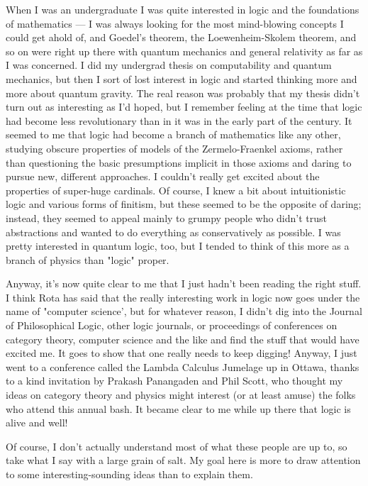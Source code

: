 

When I was an undergraduate I was quite interested in logic and the
foundations of mathematics --- I was always looking for the most
mind-blowing concepts I could get ahold of, and Goedel's theorem, the
Loewenheim-Skolem theorem, and so on were right up there with quantum
mechanics and general relativity as far as I was concerned.  I did my
undergrad thesis on computability and quantum mechanics, but then I sort
of lost interest in logic and started thinking more and more about
quantum gravity.  The real reason was probably that my thesis didn't
turn out as interesting as I'd hoped, but I remember feeling at the time
that logic had become less revolutionary than in it was in the early
part of the century.  It seemed to me that logic had become a branch of
mathematics like any other, studying obscure properties of models of the
Zermelo-Fraenkel axioms, rather than questioning the basic presumptions
implicit in those axioms and daring to pursue new, different approaches.
I couldn't really get excited about the properties of super-huge
cardinals.  Of course, I knew a bit about intuitionistic logic and
various forms of finitism, but these seemed to be the opposite of
daring; instead, they seemed to appeal mainly to grumpy people who
didn't trust abstractions and wanted to do everything as conservatively
as possible.  I was pretty interested in quantum logic, too, but I
tended to think of this more as a branch of physics than "logic" proper.

Anyway, it's now quite clear to me that I just hadn't been reading the
right stuff.  I think Rota has said that the really interesting work in
logic now goes under the name of "computer science', but for whatever
reason, I didn't dig into the Journal of Philosophical Logic, other
logic journals, or proceedings of conferences on category theory,
computer science and the like and find the stuff that would have excited
me.  It goes to show that one really needs to keep digging!  Anyway, I
just went to a conference called the Lambda Calculus Jumelage up in
Ottawa, thanks to a kind invitation by Prakash Panangaden and Phil
Scott, who thought my ideas on category theory and physics might
interest (or at least amuse) the folks who attend this annual bash.  It
became clear to me while up there that logic is alive and well!

Of course, I don't actually understand most of what these people are up
to, so take what I say with a large grain of salt.  My goal here is more
to draw attention to some interesting-sounding ideas than to explain
them.  

